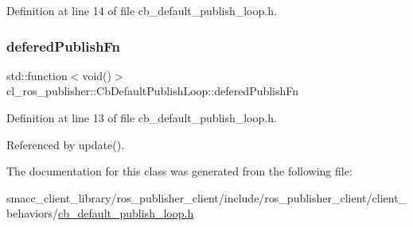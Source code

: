 Definition at line 14 of file cb\+\_\+default\+\_\+publish\+\_\+loop.\+h.

\mbox{\label{classcl__ros__publisher_1_1CbDefaultPublishLoop_ac0044704637edbd8f79a69d5b06de9ba}} 
\subsubsection{\texorpdfstring{defered\+Publish\+Fn}{deferedPublishFn}}
{\footnotesize\ttfamily std\+::function$<$void()$>$ cl\+\_\+ros\+\_\+publisher\+::\+Cb\+Default\+Publish\+Loop\+::defered\+Publish\+Fn\hspace{0.3cm}{\ttfamily [private]}}



Definition at line 13 of file cb\+\_\+default\+\_\+publish\+\_\+loop.\+h.



Referenced by update().



The documentation for this class was generated from the following file\+:\begin{DoxyCompactItemize}
\item 
smacc\+\_\+client\+\_\+library/ros\+\_\+publisher\+\_\+client/include/ros\+\_\+publisher\+\_\+client/client\+\_\+behaviors/\hyperlink{cb__default__publish__loop_8h}{cb\+\_\+default\+\_\+publish\+\_\+loop.\+h}\end{DoxyCompactItemize}
